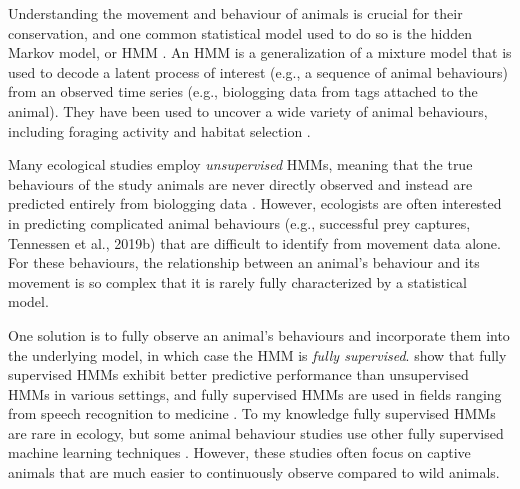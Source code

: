 

Understanding the movement and behaviour of animals is crucial for their conservation, and one common statistical model used to do so is the hidden Markov model, or HMM \citep{Sutherland:1998, Ogburn:2017, McClintock:2020}. An HMM is a generalization of a mixture model that is used to decode a latent process of interest (e.g., a sequence of animal behaviours) from an observed time series (e.g., biologging data from tags attached to the animal). They have been used to uncover a wide variety of animal behaviours, including foraging activity \citep{Lusseau:2009, Ylitalo:2023} and habitat selection \citep{Klappstein:2023}.

Many ecological studies employ \textit{unsupervised} HMMs, meaning that the true behaviours of the study animals are never directly observed and instead are predicted entirely from biologging data \citep{Barajas:2017, Patterson:2017, Pirotta:2018, Adam:2019}. However, ecologists are often interested in predicting complicated animal behaviours (e.g., successful prey captures, Tennessen et al., 2019b)\nocite{Tennessen:2019b} that are difficult to identify from movement data alone. For these behaviours, the relationship between an animal’s behaviour and its movement is so complex that it is rarely fully characterized by a statistical model.  

One solution is to fully observe an animal's behaviours and incorporate them into the underlying model, in which case the HMM is \textit{fully supervised}. \citet{Krogh:1997} show that fully supervised HMMs exhibit better predictive performance than unsupervised HMMs in various settings, and fully supervised HMMs are used in fields ranging from speech recognition to medicine \citep{Bagos:2003, Tamposis:2018}. To my knowledge fully supervised HMMs are rare in ecology, but some animal behaviour studies use other fully supervised machine learning techniques \citep{Carroll:2014, Allen:2016}. However, these studies often focus on captive animals that are much easier to continuously observe compared to wild animals.

